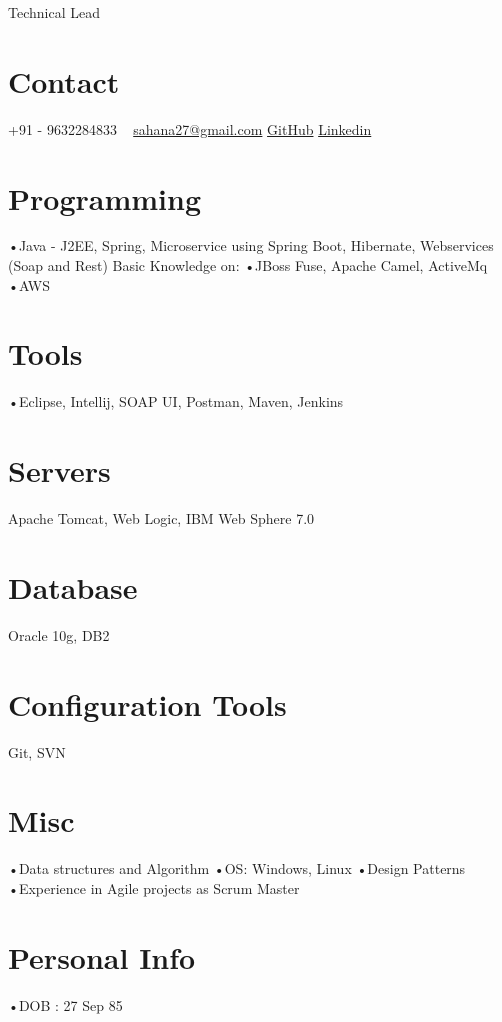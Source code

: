 \documentclass[]{kartikkumar-cv}
\begin{document}
       {Technical Lead}
          
\begin{aside}
  \section{Contact}
    +91 - 9632284833
    ~
    \href{mailto:sahana27@gmail.com}{sahana27@gmail.com}
    \href{https://github.com/sahanarao}{GitHub}
    \href{https://www.linkedin.com/in/sahana-rao-3445aa46/}{Linkedin}
    ~
   \section{Programming}
   •Java - J2EE, Spring, 
   Microservice using Spring Boot, 
   Hibernate, Webservices (Soap and Rest)
   Basic Knowledge on:
   •JBoss Fuse, Apache Camel, ActiveMq
   •AWS
    ~
    \section{Tools}    
    •Eclipse, Intellij, SOAP UI, Postman,
    Maven, Jenkins  
    \section{Servers}
     Apache Tomcat, Web Logic, IBM Web Sphere 7.0
     \section{Database}
     Oracle 10g, DB2
     \section{Configuration Tools}
     Git, SVN
    \section{Misc}
   •Data structures and Algorithm
   •OS: Windows, Linux
   •Design Patterns
   •Experience in Agile projects as Scrum Master
   ~
   \section{Personal Info}
   •DOB : 27 Sep 85
   ~
\end{aside}
\end{document}

